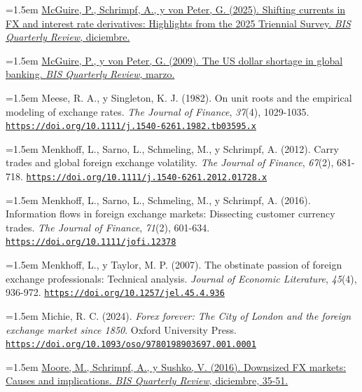 \documentclass[10pt,a4paper]{article}
\begin{document}
\noindent\hangindent=1.5em \href{https://www.bis.org/publications/qr-202512/foreword-shifting-currents-fx-and-interest-rate-derivatives-highlights-2025-triennial-survey}{McGuire, P., Schrimpf, A., y von Peter, G. (2025). Shifting currents in FX and interest rate derivatives: Highlights from the 2025 Triennial Survey. \textit{BIS Quarterly Review}, diciembre.}

\noindent\hangindent=1.5em \href{https://www.bis.org/publ/qtrpdf/r_qt0903f.htm}{McGuire, P., y von Peter, G. (2009). The US dollar shortage in global banking. \textit{BIS Quarterly Review}, marzo.}

\noindent\hangindent=1.5em Meese, R. A., y Singleton, K. J. (1982). On unit roots and the empirical modeling of exchange rates. \textit{The Journal of Finance}, \textit{37}(4), 1029-1035. \href{https://doi.org/10.1111/j.1540-6261.1982.tb03595.x}{\nolinkurl{https://doi.org/10.1111/j.1540-6261.1982.tb03595.x}}

\noindent\hangindent=1.5em Menkhoff, L., Sarno, L., Schmeling, M., y Schrimpf, A. (2012). Carry trades and global foreign exchange volatility. \textit{The Journal of Finance}, \textit{67}(2), 681-718. \href{https://doi.org/10.1111/j.1540-6261.2012.01728.x}{\nolinkurl{https://doi.org/10.1111/j.1540-6261.2012.01728.x}}

\noindent\hangindent=1.5em Menkhoff, L., Sarno, L., Schmeling, M., y Schrimpf, A. (2016). Information flows in foreign exchange markets: Dissecting customer currency trades. \textit{The Journal of Finance}, \textit{71}(2), 601-634. \href{https://doi.org/10.1111/jofi.12378}{\nolinkurl{https://doi.org/10.1111/jofi.12378}}

\noindent\hangindent=1.5em Menkhoff, L., y Taylor, M. P. (2007). The obstinate passion of foreign exchange professionals: Technical analysis. \textit{Journal of Economic Literature}, \textit{45}(4), 936-972. \href{https://doi.org/10.1257/jel.45.4.936}{\nolinkurl{https://doi.org/10.1257/jel.45.4.936}}

\noindent\hangindent=1.5em Michie, R. C. (2024). \textit{Forex forever: The City of London and the foreign exchange market since 1850}. Oxford University Press. \href{https://doi.org/10.1093/oso/9780198903697.001.0001}{\nolinkurl{https://doi.org/10.1093/oso/9780198903697.001.0001}}

\noindent\hangindent=1.5em \href{https://www.bis.org/publ/qtrpdf/r_qt1612e.htm}{Moore, M., Schrimpf, A., y Sushko, V. (2016). Downsized FX markets: Causes and implications. \textit{BIS Quarterly Review}, diciembre, 35-51.}
\end{document}
